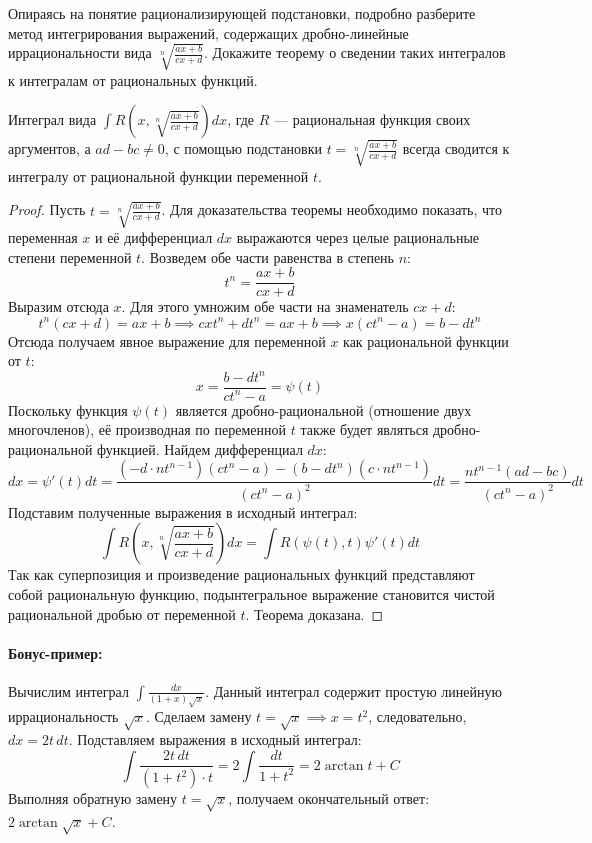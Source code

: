 {Опираясь на понятие рационализирующей подстановки, подробно разберите метод интегрирования выражений, содержащих дробно-линейные иррациональности вида $\sqrt[n]{\frac{ax+b}{cx+d}}$. Докажите теорему о сведении таких интегралов к интегралам от рациональных функций.}

\begin{theorem}
Интеграл вида $\int R\left(x, \sqrt[n]{\frac{ax+b}{cx+d}}\right) dx$, где $R$ — рациональная функция своих аргументов, а $ad - bc \neq 0$, с помощью подстановки $t = \sqrt[n]{\frac{ax+b}{cx+d}}$ всегда сводится к интегралу от рациональной функции переменной $t$.
\end{theorem}

\begin{proof}
Пусть $t = \sqrt[n]{\frac{ax+b}{cx+d}}$. Для доказательства теоремы необходимо показать, что переменная $x$ и её дифференциал $dx$ выражаются через целые рациональные степени переменной $t$. Возведем обе части равенства в степень $n$:
$$ t^n = \frac{ax+b}{cx+d} $$
Выразим отсюда $x$. Для этого умножим обе части на знаменатель $cx+d$:
$$ t^n(cx + d) = ax + b \implies c x t^n + d t^n = a x + b \implies x(c t^n - a) = b - d t^n $$
Отсюда получаем явное выражение для переменной $x$ как рациональной функции от $t$:
$$ x = \frac{b - d t^n}{c t^n - a} = \psi(t) $$
Поскольку функция $\psi(t)$ является дробно-рациональной (отношение двух многочленов), её производная по переменной $t$ также будет являться дробно-рациональной функцией. Найдем дифференциал $dx$:
$$ dx = \psi'(t)dt = \frac{(-d \cdot n t^{n-1})(c t^n - a) - (b - d t^n)(c \cdot n t^{n-1})}{(c t^n - a)^2} dt = \frac{n t^{n-1}(ad - bc)}{(c t^n - a)^2} dt $$
Подставим полученные выражения в исходный интеграл:
$$ \int R\left(x, \sqrt[n]{\frac{ax+b}{cx+d}}\right) dx = \int R\left( \psi(t), t \right) \psi'(t) dt $$
Так как суперпозиция и произведение рациональных функций представляют собой рациональную функцию, подынтегральное выражение становится чистой рациональной дробью от переменной $t$. Теорема доказана.
\end{proof}

\paragraph{Бонус-пример:} Вычислим интеграл $\int \frac{dx}{(1+x)\sqrt{x}}$.
Данный интеграл содержит простую линейную иррациональность $\sqrt{x}$. Сделаем замену $t = \sqrt{x} \implies x = t^2$, следовательно, $dx = 2t\,dt$. Подставляем выражения в исходный интеграл:
$$ \int \frac{2t\,dt}{(1+t^2) \cdot t} = 2 \int \frac{dt}{1+t^2} = 2 \arctan t + C $$
Выполняя обратную замену $t = \sqrt{x}$, получаем окончательный ответ: $2 \arctan\sqrt{x} + C$.

